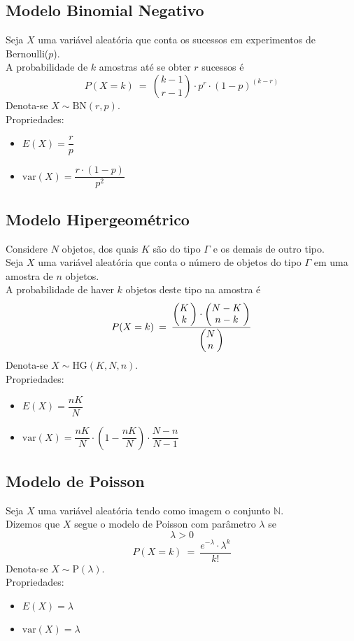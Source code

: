 \documentclass{article}
\makeatletter
\newcommand{\Binom}[2]{%
  \left(
    \begin{array}{@{}c@{\,}} #1\\#2 \end{array}
  \right)
}
\makeatother
\begin{document}
\pagebreak


\subsection{Modelo Binomial Negativo}
Seja $X$ uma variável aleatória que conta os sucessos em experimentos de Bernoulli($p$). \\
A probabilidade de $k$ amostras até se obter $r$ sucessos é
\[ P(X = k) \>=\> {{k -1} \choose {r - 1}} \cdot p^r \cdot {(1 - p)}^{(k - r)} \]
Denota-se $X \sim \text{BN}(r, p)$. \\[10pt]
Propriedades:
\begin{itemize}
  \item $E(X) = \dfrac{r}{p}$
  \item $\text{var}(X) = \dfrac{r \cdot (1 - p)}{p^2}$
\end{itemize}


\subsection{Modelo Hipergeométrico}
Considere $N$ objetos, dos quais $K$ são do tipo $\Gamma$ e os demais de outro tipo. \\
Seja $X$ uma variável aleatória que conta o número de objetos do tipo $\Gamma$ em uma amostra de $n$ objetos. \\
A probabilidade de haver $k$ objetos deste tipo na amostra é
\[ P(X = k) \>=\> \frac{\Binom{K}{k} \cdot \Binom{N - K}{n - k}}{\Binom{N}{n}} \]
Denota-se $X \sim \text{HG}(K, N, n)$. \\[10pt]
Propriedades:
\begin{itemize}
  \item $E(X) = \dfrac{nK}{N}$
  \item $\text{var}(X) = \dfrac{nK}{N} \cdot \left( 1 - \dfrac{nK}{N} \right) \cdot \dfrac{N - n}{N - 1}$
\end{itemize}


\subsection{Modelo de Poisson}
Seja $X$ uma variável aleatória tendo como imagem o conjunto $\mathbb{N}$. \\
Dizemos que $X$ segue o modelo de Poisson com parâmetro $\lambda$ se
\[ \lambda > 0 \]
\[ P(X = k) \>=\> \frac{e^{-\lambda} \cdot \lambda^k}{k!} \]
Denota-se $X \sim \text{P}(\lambda)$. \\[10pt]
Propriedades:
\begin{itemize}
  \item $E(X) = \lambda$
  \item $\text{var}(X) = \lambda$
\end{itemize}
\end{document}
